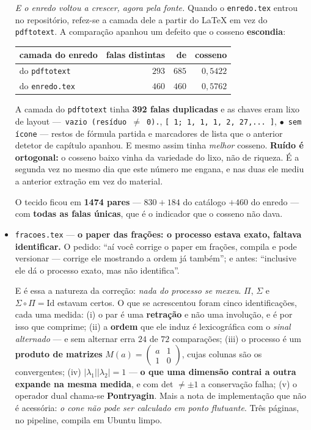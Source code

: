 \documentclass[11pt]{article}
\newcommand{\code}[1]{\texttt{\small #1}}
\theoremstyle{plain}
\theoremstyle{remark}
\begin{document}
\begin{itemize}
\emph{E o enredo voltou a crescer, agora pela fonte.} Quando o \code{enredo.tex} entrou no
repositório, refez-se a camada dele a partir do LaTeX em vez do \code{pdftotext}. A comparação
apanhou um defeito que o cosseno \textbf{escondia}:

\begin{center}\small
\begin{tabular}{lrrr}
camada do enredo & falas distintas & de & cosseno \\ \hline
do \code{pdftotext} & $293$ & $685$ & $0{,}5422$ \\
do \code{enredo.tex} & $460$ & $460$ & $0{,}5762$ \\
\end{tabular}
\end{center}

A camada do \code{pdftotext} tinha \textbf{392 falas duplicadas} e as chaves eram lixo de layout
---\ \code{vazio (resíduo $\neq$ 0).}, \code{[ 1; 1, 1, 1, 2, 27,... ]}, \code{$\bullet$ sem
ícone} --- restos de fórmula partida e marcadores de lista que o anterior detetor de capítulo apanhou. E
mesmo assim tinha \emph{melhor} cosseno. \textbf{Ruído é ortogonal:} o cosseno baixo vinha da
variedade do lixo, não de riqueza. É a segunda vez no mesmo dia que este número me engana, e nas
duas ele mediu a anterior extração em vez do material.

O tecido ficou em \textbf{1474 pares} --- $830 + 184$ do catálogo $+ 460$ do enredo --- com
\textbf{todas as falas únicas}, que é o indicador que o cosseno não dava.

\item \code{fracoes.tex} --- \textbf{o paper das frações: o processo estava exato, faltava
identificar.} O pedido: ``aí você corrige o paper em frações, compila e pode versionar --- corrige
ele mostrando a ordem já também''; e antes: ``inclusive ele dá o processo exato, mas não
identifica''.

E é essa a natureza da correção: \emph{nada do processo se mexeu}. $\Pi$, $\Sigma$ e
$\Sigma\circ\Pi = \mathrm{Id}$ estavam certos. O que se acrescentou foram cinco identificações, cada
uma medida: (i) o par é uma \textbf{retração} e não uma involução, e é por isso que comprime; (ii) a
\textbf{ordem} que ele induz é lexicográfica com o \emph{sinal alternado} --- e sem alternar erra
$24$ de $72$ comparações; (iii) o processo é um \textbf{produto de matrizes} $M(a) =
\left(\begin{smallmatrix}a&1\\1&0\end{smallmatrix}\right)$, cujas colunas são os convergentes; (iv)
$|\lambda_1||\lambda_2| = 1$ --- \textbf{o que uma dimensão contrai a outra expande na mesma
medida}, e com det $\neq \pm 1$ a conservação falha; (v) o operador dual chama-se
\textbf{Pontryagin}. Mais a nota de implementação que não é acessória: \emph{o cone não pode ser
calculado em ponto flutuante}. Três páginas, no pipeline, compila em Ubuntu limpo.


\end{itemize}
\end{document}
